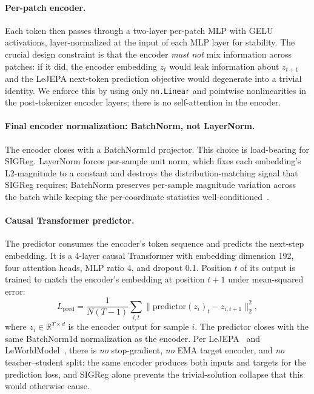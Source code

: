 \paragraph{Per-patch encoder.}
Each token then passes through a two-layer per-patch MLP with GELU
activations, layer-normalized at the input of each MLP layer for stability.
The crucial design constraint is that the encoder \emph{must not} mix
information across patches: if it did, the encoder embedding $z_t$ would
leak information about $z_{t+1}$ and the LeJEPA next-token prediction
objective would degenerate into a trivial identity. We enforce this by
using only \texttt{nn.Linear} and pointwise nonlinearities in the
post-tokenizer encoder layers; there is no self-attention in the encoder.

\paragraph{Final encoder normalization: BatchNorm, not LayerNorm.}
The encoder closes with a BatchNorm1d projector. This choice is load-bearing
for SIGReg. LayerNorm forces per-sample unit norm, which fixes each
embedding's L2-magnitude to a constant and destroys the distribution-matching
signal that SIGReg requires; BatchNorm preserves per-sample magnitude
variation across the batch while keeping the per-coordinate statistics
well-conditioned~\cite[App.~A]{lewm2026}.

\paragraph{Causal Transformer predictor.}
The predictor consumes the encoder's token sequence and predicts the
next-step embedding. It is a 4-layer causal Transformer with embedding
dimension 192, four attention heads, MLP ratio 4, and dropout 0.1. Position
$t$ of its output is trained to match the encoder's embedding at position
$t{+}1$ under mean-squared error:
\begin{equation}
  L_\text{pred} = \frac{1}{N(T-1)}\sum_{i,t}
    \|\text{predictor}(z_i)_t - z_{i,t+1}\|_2^2,
  \label{eq:lpred}
\end{equation}
where $z_i \in \mathbb{R}^{T \times d}$ is the encoder output for sample $i$.
The predictor closes with the same BatchNorm1d normalization as the encoder.
Per LeJEPA~\cite{lejepa2025} and LeWorldModel~\cite{lewm2026}, there is
\emph{no} stop-gradient, \emph{no} EMA target encoder, and \emph{no}
teacher--student split: the same encoder produces both inputs and targets
for the prediction loss, and SIGReg alone prevents the trivial-solution
collapse that this would otherwise cause.

